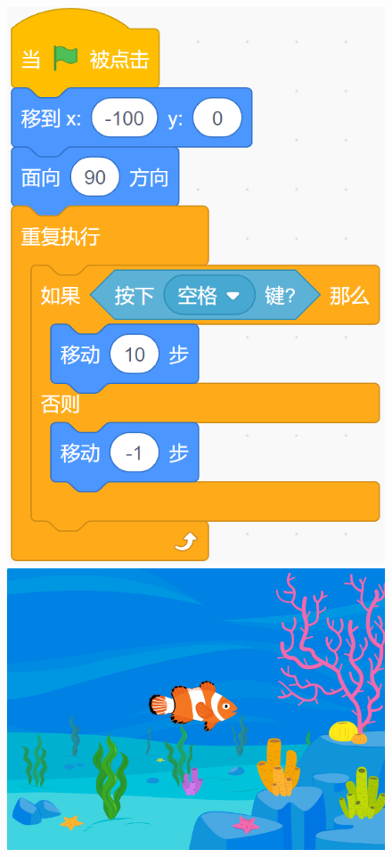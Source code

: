 \documentclass[10pt, a4paper]{article}
\begin{document}
\begin{enumerate}
        \begin{figure}[htbp]
            \begin{minipage}[t]{.35\textwidth}
                \centering
                \begin{minipage}[t]{.45\textwidth}
                    \includegraphics[width=\textwidth]{2-1.png}
                \end{minipage}
                \begin{minipage}[t]{.53\textwidth}
                    \includegraphics[width=\textwidth]{2-2.png}

\end{minipage}
\end{minipage}
\end{figure}
\end{enumerate}
\end{document}
